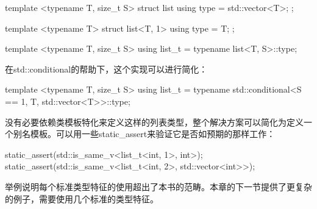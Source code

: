 \begin{cpp}
template <typename T, size_t S>
struct list
{
	using type = std::vector<T>;
};

template <typename T>
struct list<T, 1>
{
	using type = T;
};

template <typename T, size_t S>
using list_t = typename list<T, S>::type;
\end{cpp}

在std::conditional的帮助下，这个实现可以进行简化：

\begin{cpp}
template <typename T, size_t S>
using list_t =
	typename std::conditional<S ==
					1, T, std::vector<T>>::type;
\end{cpp}

没有必要依赖类模板特化来定义这样的列表类型，整个解决方案可以简化为定义一个别名模板。可以用一些static\_assert来验证它是否如预期的那样工作：

\begin{cpp}
static_assert(std::is_same_v<list_t<int, 1>, int>);
static_assert(std::is_same_v<list_t<int, 2>,
							std::vector<int>>);
\end{cpp}

举例说明每个标准类型特征的使用超出了本书的范畴。本章的下一节提供了更复杂的例子，需要使用几个标准的类型特征。